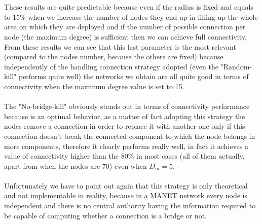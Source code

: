 \documentclass{llncs}
\begin{document}
\\\\
These results are quite predictable because even if the radius is fixed and equals to  15\% when we increase the number of nodes they end up in filling up the whole area on which they are deployed and if the number of possible connection per node (the maximum degree) is sufficient then we can achieve full connectivity.\\
From these results we can see that this last parameter is the most relevant (compared to the nodes number, because the others are fixed) because independently of the handling connection strategy adopted (even the "Random-kill" performs quite well) the networks we obtain are all quite good in terms of connectivity when the maximum degree value is set to 15.
\\\\
The "No-bridge-kill" obviously stands out in terms of connectivity performance because is an optimal behavior, as a matter of fact adopting this strategy the nodes remove a connection in order to replace it with another one only if this connection doesn't break the connected component to which the node belongs in more components, therefore it clearly performs really well, in fact it achieves a value of connectivity higher than the 80\% in most cases (all of them actually, apart from when the nodes are 70) even when $D_{m}=5$.\\\\
Unfortunately we have to point out again that this strategy is only theoretical and not implementable in reality, because in a MANET network every node is independent and there is no central authority having the information required to be capable of computing whether a connection is a bridge or not.
%
%
\end{document}
